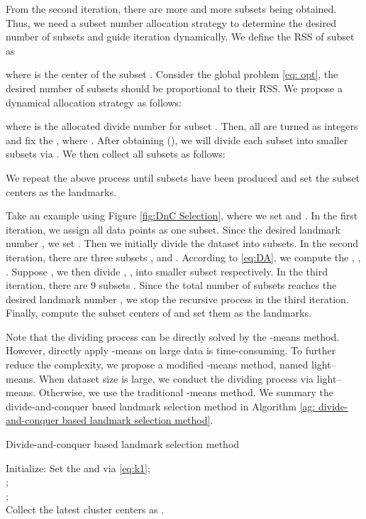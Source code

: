 \documentclass[a4paper,fleqn]{cas-dc}
\begin{document}
From the second iteration, there are more and more subsets being obtained. 
Thus, we need a subset number allocation strategy to determine the desired number of subsets and guide iteration dynamically.
We define the RSS of subset  as 

where  is the center of the subset .
Consider the global problem \eqref{eq: opt}, the desired number of subsets should be proportional to their RSS.
We propose a dynamical allocation strategy as follows: 

where  is the allocated divide number for subset .
Then, all  are turned as integers and fix the , where .
After obtaining  (), we will divide each subset  into  smaller subsets via .
We then collect all subsets as follows: 

We repeat the above process until  subsets have been produced and set the  subset centers as the landmarks.

Take an example using Figure \ref{fig:DnC Selection}, where we set  and .
In the first iteration, we assign all data points as one subset. 
Since the desired landmark number , we set .
Then we initially divide the dataset  into  subsets. 
In the second iteration, there are three subsets ,  and .
According to \eqref{eq:DA}, we compute the , , .
Suppose , we then divide , ,  into  smaller subset respectively.
In the third iteration, there are 9 subsets .
Since the total number of subsets  reaches the desired landmark number , we stop the recursive process in the third iteration. 
Finally, compute the subset centers  of  and set them as the landmarks.

Note that the dividing process  can be directly solved by the -means method.
However, directly apply -means on large data is time-consuming.
To further reduce the complexity, we propose a modified -means method, named light--means.
When dataset size is large, we conduct the dividing process via light--means. 
Otherwise, we use the traditional -means method.
We summary the divide-and-conquer based landmark selection method in Algorithm \ref{ag: divide-and-conquer based landmark selection method}.


\begin{algorithm}
  \label{ag: divide-and-conquer based landmark selection method}
  \caption{Divide-and-conquer based landmark selection method}
  \SetAlgoLined
  Initialize: Set the  and  via \eqref{eq:k1};\\   
;\\
  ;\\
  Collect the latest cluster centers as .
\end{algorithm}
\end{document}
